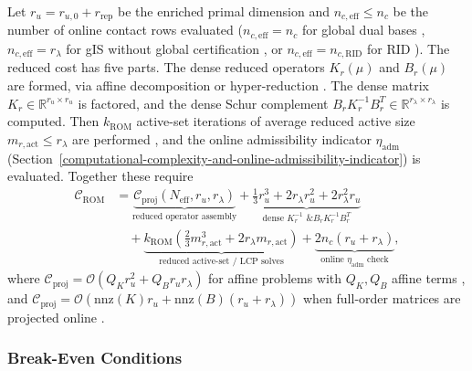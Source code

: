 \documentclass[11pt,a4paper]{article}
\begin{document}
Let \(r_u = r_{u,0} + r_{\text{rep}}\) be the enriched primal dimension and \(n_{c,\text{eff}} \le n_c\) be the number of online contact rows evaluated (\(n_{c,\text{eff}} = n_c\) for global dual bases \cite{balajewicz2016projection, benaceur2020reduced}, \(n_{c,\text{eff}} = r_\lambda\) for gIS without global certification \cite{sambataro2026model}, or \(n_{c,\text{eff}} = n_{c,\text{RID}}\) for RID \cite{fauque2018hybrid}). The reduced cost has five parts. The dense reduced operators \(K_r(\mu)\) and \(B_r(\mu)\) are formed, via affine decomposition or hyper-reduction \cite{benaceur2020reduced, koller2021hyper}. The dense matrix \(K_r \in \mathbb{R}^{r_u \times r_u}\) is factored, and the dense Schur complement \(B_r K_r^{-1} B_r^T \in \mathbb{R}^{r_\lambda \times r_\lambda}\) is computed. Then \(k_{\text{ROM}}\) active-set iterations of average reduced active size \(m_{r,\text{act}} \le r_\lambda\) are performed \cite{leberre2022condition}, and the online admissibility indicator \(\eta_{\text{adm}}\) (Section~\ref{computational-complexity-and-online-admissibility-indicator}) is evaluated. Together these require
\begin{equation}\label{eq:crom}\begin{aligned}
\mathcal{C}_{\text{ROM}} &= \underbrace{\mathcal{C}_{\text{proj}}(N_{\text{eff}}, r_u, r_\lambda)}_{\text{reduced operator assembly}} + \underbrace{\tfrac{1}{3} r_u^3 + 2 r_\lambda r_u^2 + 2 r_\lambda^2 r_u}_{\text{dense } K_r^{-1} \text{ \& } B_r K_r^{-1} B_r^T} \\
&\quad + \underbrace{k_{\text{ROM}} \left( \tfrac{2}{3} m_{r,\text{act}}^3 + 2 r_\lambda m_{r,\text{act}} \right)}_{\text{reduced active-set / LCP solves}} + \underbrace{2 n_c (r_u + r_\lambda)}_{\text{online } \eta_{\text{adm}} \text{ check}},
\end{aligned}\end{equation}
where \(\mathcal{C}_{\text{proj}} = \mathcal{O}(Q_K r_u^2 + Q_B r_u r_\lambda)\) for affine problems with \(Q_K, Q_B\) affine terms \cite{benaceur2020reduced}, and \(\mathcal{C}_{\text{proj}} = \mathcal{O}(\text{nnz}(K) r_u + \text{nnz}(B) (r_u + r_\lambda))\) when full-order matrices are projected online \cite{koller2021hyper, aresdeparga2023petrov}.

\hypertarget{break-even-conditions}{%
\subsubsection{Break-Even Conditions}\label{break-even-conditions}}
\end{document}
